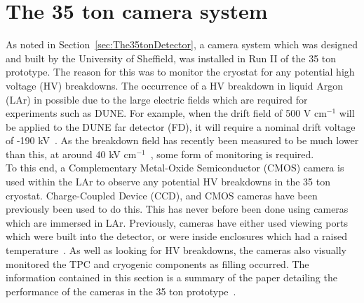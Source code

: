 
\chapter{The 35 ton camera system}  %



\graphicspath{{The35tonCameras/Figs/Raster/}{The35tonCameras/Figs/PDF/}{The35tonCameras/Figs/Vector/}}

As noted in Section~\ref{sec:The35tonDetector}, a camera system which was designed and built by the University of Sheffield, was installed in Run II of the 35 ton prototype. The reason for this was to monitor the cryostat for any potential high voltage (HV) breakdowns. The occurrence of a HV breakdown in liquid Argon (LAr) in possible due to the large electric fields which are required for experiments such as DUNE. For example, when the drift field of 500 V cm$^{-1}$ will be applied to the DUNE far detector (FD), it will require a nominal drift voltage of -190 kV~\citep{DUNECDR_V2}. As the breakdown field has recently been measured to be much lower than this, at around 40 kV cm$^{-1}$~\citep{BlatterEField}, some form of monitoring is required. \\

To this end, a Complementary Metal-Oxide Semiconductor (CMOS) camera is used within the LAr to observe any potential HV breakdowns in the 35 ton cryostat. Charge-Coupled Device (CCD), and CMOS cameras have been previously been used to do this. This has never before been done using cameras which are immersed in LAr. Previously, cameras have either used viewing ports which were built into the detector, or were inside enclosures which had a raised temperature~\citep{BlatterEField,BERNcam,LAPD,Liverpool,Weizmannbubbles}. As well as looking for HV breakdowns, the cameras also visually monitored the TPC and cryogenic components as filling occurred. The information contained in this section is a summary of the paper detailing the performance of the cameras in the 35 ton prototype~\citep{CameraPaper}. \\

